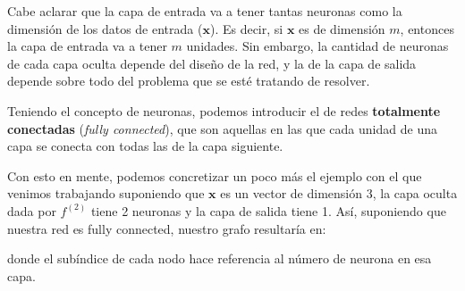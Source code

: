 \documentclass[../../main.tex]{subfiles}
\begin{document}
Cabe aclarar que la capa de entrada va a tener tantas neuronas como la dimensión de los
datos de entrada (\(\mathbf{x}\)). Es decir, si \(\mathbf{x}\) es de dimensión \(m\),
entonces la capa de entrada va a tener \(m\) unidades. Sin embargo, la cantidad de
neuronas de cada capa oculta depende del diseño de la red, y la de la capa de salida
depende sobre todo del problema que se esté tratando de resolver.

Teniendo el concepto de neuronas, podemos introducir el de redes \textbf{totalmente
conectadas} (\textit{fully connected}), que son aquellas en las que cada unidad de una
capa se conecta con todas las de la capa siguiente.

Con esto en mente, podemos concretizar un poco más el ejemplo con el que venimos
trabajando suponiendo que \(\mathbf{x}\) es un vector de dimensión 3, la capa oculta dada
por \(f^{(2)}\) tiene 2 neuronas y la capa de salida tiene 1. Así, suponiendo que nuestra
red es fully connected, nuestro grafo resultaría en:
\begin{center}
\end{center}
donde el subíndice de cada nodo hace referencia al número de neurona en esa capa.
\end{document}
